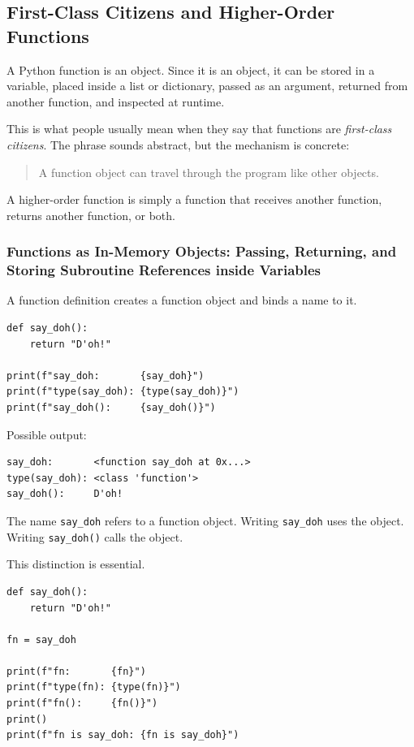 \subsection{First-Class Citizens and Higher-Order Functions}

A Python function is an object. Since it is an object, it can be stored in a variable, placed inside a list or dictionary, passed as an argument, returned from another function, and inspected at runtime.

This is what people usually mean when they say that functions are \textit{first-class citizens}. The phrase sounds abstract, but the mechanism is concrete:

\begin{quote}
A function object can travel through the program like other objects.
\end{quote}

A higher-order function is simply a function that receives another function, returns another function, or both.

\subsubsection{Functions as In-Memory Objects: Passing, Returning, and Storing Subroutine References inside Variables}

A function definition creates a function object and binds a name to it.

\begin{verbatim}
def say_doh():
    return "D'oh!"

print(f"say_doh:       {say_doh}")
print(f"type(say_doh): {type(say_doh)}")
print(f"say_doh():     {say_doh()}")
\end{verbatim}

Possible output:

\begin{verbatim}
say_doh:       <function say_doh at 0x...>
type(say_doh): <class 'function'>
say_doh():     D'oh!
\end{verbatim}

The name \texttt{say\_doh} refers to a function object. Writing \texttt{say\_doh} uses the object. Writing \texttt{say\_doh()} calls the object.

This distinction is essential.

\begin{verbatim}
def say_doh():
    return "D'oh!"

fn = say_doh

print(f"fn:       {fn}")
print(f"type(fn): {type(fn)}")
print(f"fn():     {fn()}")
print()
print(f"fn is say_doh: {fn is say_doh}")
\end{verbatim}

